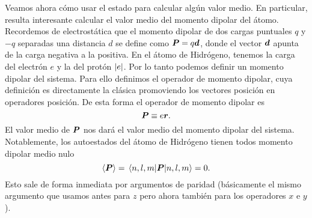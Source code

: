 \documentclass[10pt, a4paper]{article}
\numberwithin{equation}{subsection}
\begin{document}
Veamos ahora cómo usar el estado para calcular algún valor medio. En
particular, resulta interesante calcular el valor medio del momento dipolar del
átomo.  Recordemos de electrostática que el momento dipolar de dos cargas
puntuales $q$ y $-q$ separadas una distancia $d$ se define como $\vb*{P} =
q\vb*{d}$, donde el vector $\vb*{d}$ apunta de la carga negativa a la
positiva. En el átomo de Hidrógeno, tenemos la carga del electrón $e$ y la del
protón $\abs{e}$. Por lo tanto podemos definir un momento dipolar del sistema.
Para ello definimos el operador de momento dipolar, cuya definición es
directamente la clásica promoviendo los vectores posición en operadores
posición. De esta forma el operador de momento dipolar es
\begin{equation}
  \vb*{P} \equiv e\vb*{r}.
\end{equation}
El valor medio de $\vb*{P}$ nos dará el valor medio del momento dipolar del
sistema. Notablemente, los autoestados del átomo de Hidrógeno tienen todos
momento dipolar medio nulo
\begin{equation}
  \expval{\vect{P}} = \matrixel{n,l,m}{\vect{P}}{n,l,m} = 0.
\end{equation}
Esto sale de forma inmediata por argumentos de paridad (básicamente el mismo
argumento que usamos antes para $z$ pero ahora también para los operadores $x$
e $y$).
\end{document}
